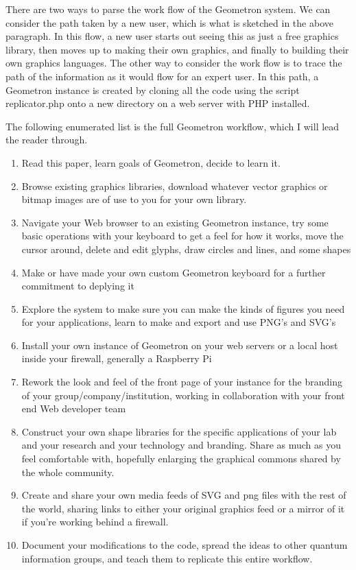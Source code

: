 \documentclass[11pt]{article}
\begin{document}
There are two ways to parse the work flow of the Geometron system.  We can consider the path taken by a new user, which is what is sketched in the above paragraph.  In this flow, a new user starts out seeing this as just a free graphics library, then moves up to making their own graphics, and finally to building their own graphics languages.  The other way to consider the work flow is to trace the path of the information as it would flow for an expert user.  In this path, a Geometron instance is created by cloning all the code using the script replicator.php onto a new directory on a web server with PHP installed.  

The following enumerated list is the full Geometron workflow, which I will lead the reader through. 
\begin{enumerate}

\item Read this paper, learn goals of Geometron, decide to learn it.
\item Browse existing graphics libraries, download whatever vector graphics or bitmap images are of use to you for your own library.
\item Navigate your Web browser to an existing Geometron instance, try some basic operations with your keyboard to get a feel for how it works, move the cursor around, delete and edit glyphs, draw circles and lines, and some shapes
\item Make or have made your own custom Geometron keyboard for a further commitment to deplying it
\item Explore the system to make sure you can make the kinds of figures you need for your applications, learn to make and export and use PNG's and SVG's
\item Install your own instance of Geometron on your web servers or a local host inside your firewall, generally a Raspberry Pi
\item Rework the look and feel of the front page of your instance for the branding of your group/company/institution, working in collaboration with your front end Web developer team 
\item Construct your own shape libraries for the specific applications of your lab and your research and your technology and branding.  Share as much as you feel comfortable with, hopefully enlarging the graphical commons shared by the whole community.  
\item Create and share your own media feeds of SVG and png files with the rest of the world, sharing links to either your original graphics feed or a mirror of it if you're working behind a firewall.
\item Document your modifications to the code, spread the ideas to other quantum information groups, and teach them to replicate this entire workflow.


\end{enumerate}
\end{document}
